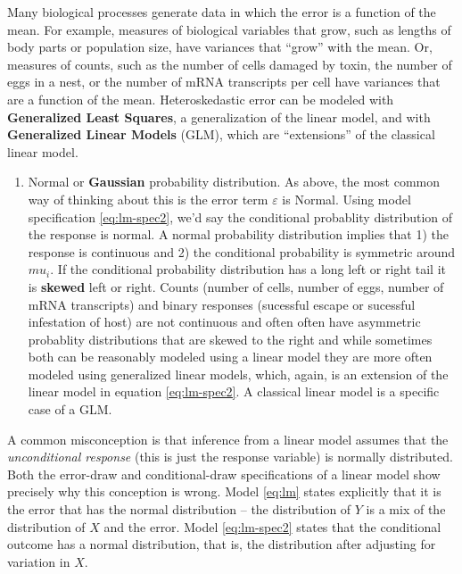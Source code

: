 \documentclass[]{book}
\providecommand{\tightlist}{%
  \setlength{\itemsep}{0pt}\setlength{\parskip}{0pt}}
\begin{document}
Many biological processes generate data in which the error is a function of the mean. For example, measures of biological variables that grow, such as lengths of body parts or population size, have variances that ``grow'' with the mean. Or, measures of counts, such as the number of cells damaged by toxin, the number of eggs in a nest, or the number of mRNA transcripts per cell have variances that are a function of the mean. Heteroskedastic error can be modeled with \textbf{Generalized Least Squares}, a generalization of the linear model, and with \textbf{Generalized Linear Models} (GLM), which are ``extensions'' of the classical linear model.

\begin{enumerate}
\def\labelenumi{\arabic{enumi}.}
\setcounter{enumi}{1}
\tightlist
\item
  Normal or \textbf{Gaussian} probability distribution. As above, the most common way of thinking about this is the error term \(\varepsilon\) is Normal. Using model specification \eqref{eq:lm-spec2}, we'd say the conditional probablity distribution of the response is normal. A normal probability distribution implies that 1) the response is continuous and 2) the conditional probability is symmetric around \(mu_i\). If the conditional probability distribution has a long left or right tail it is \textbf{skewed} left or right. Counts (number of cells, number of eggs, number of mRNA transcripts) and binary responses (sucessful escape or sucessful infestation of host) are not continuous and often often have asymmetric probablity distributions that are skewed to the right and while sometimes both can be reasonably modeled using a linear model they are more often modeled using generalized linear models, which, again, is an extension of the linear model in equation \eqref{eq:lm-spec2}. A classical linear model is a specific case of a GLM.
\end{enumerate}

A common misconception is that inference from a linear model assumes that the \emph{unconditional response} (this is just the response variable) is normally distributed. Both the error-draw and conditional-draw specifications of a linear model show precisely why this conception is wrong. Model \eqref{eq:lm} states explicitly that it is the error that has the normal distribution -- the distribution of \(Y\) is a mix of the distribution of \(X\) and the error. Model \eqref{eq:lm-spec2} states that the conditional outcome has a normal distribution, that is, the distribution after adjusting for variation in \(X\).
\end{document}
